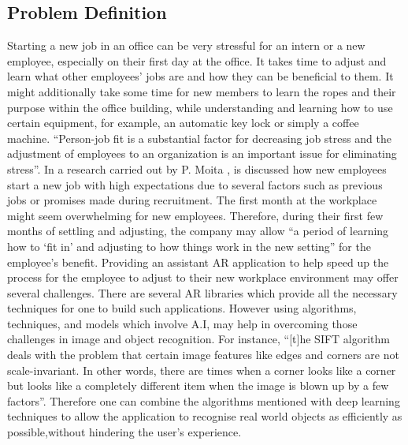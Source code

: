 \documentclass{aifyp}
\begin{document}
\subsection{Problem Definition}
\indent Starting a new job in an office can be very stressful for an intern or a new employee, especially on their first day at the office. It takes time to adjust and learn what other employees’ jobs are and how they can be beneficial to them. It might additionally take some time for new members to learn the ropes and their purpose within the office building, while understanding and learning how to use certain equipment, for example, an automatic key lock or simply a coffee machine. ``Person-job fit is a substantial factor for decreasing job stress and the adjustment of employees to an organization is an important issue for eliminating stress”\cite{DENIZ2015369}.
In a research carried out by  P. Moita \cite{MOITA8S}, is discussed how new employees start a new job with high expectations due to several factors such as previous jobs or promises made during recruitment. The first month at the workplace might seem overwhelming for new employees. Therefore, during their first few months of settling and adjusting, the company may allow ``a period of learning how to ‘fit in’ and adjusting to how things work in the new setting”\cite{MOITA8S} for the employee’s benefit.
\newline
\newline
\indent Providing an assistant AR application to help speed up the process for the employee to adjust to their new workplace environment may offer several challenges. There are several AR libraries which provide all the necessary techniques for one to build such applications. However using algorithms, techniques, and models which involve A.I, may help in overcoming those challenges in image and object recognition. 
For instance, ``[t]he SIFT algorithm deals with the problem that certain image features like edges and corners are not scale-invariant. In other words, there are times when a corner looks like a corner but looks like a completely different item when the image is blown up by a few factors”\cite{Lee2016ComparingDN}. Therefore one can combine the algorithms mentioned with deep learning techniques to allow the application to recognise real world objects as efficiently as possible,without hindering the user's experience. 
\end{document}
